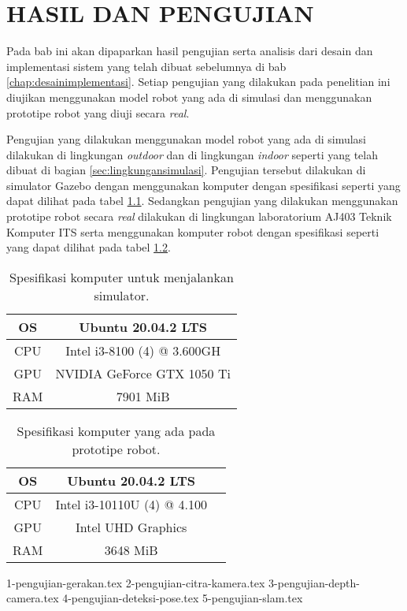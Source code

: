 \chapter{HASIL DAN PENGUJIAN}
\label{chap:hasilpengujian}

Pada bab ini akan dipaparkan hasil pengujian serta analisis dari desain dan implementasi sistem yang telah dibuat sebelumnya di bab \ref{chap:desainimplementasi}.
Setiap pengujian yang dilakukan pada penelitian ini diujikan menggunakan model robot yang ada di simulasi dan menggunakan prototipe robot yang diuji secara \emph{real}.

Pengujian yang dilakukan menggunakan model robot yang ada di simulasi dilakukan di lingkungan \emph{outdoor} dan di lingkungan \emph{indoor} seperti yang telah dibuat di bagian \ref{sec:lingkungansimulasi}.
Pengujian tersebut dilakukan di simulator Gazebo dengan menggunakan komputer dengan spesifikasi seperti yang dapat dilihat pada tabel \ref{tb:spesifikasikomputersimulator}.
Sedangkan pengujian yang dilakukan menggunakan prototipe robot secara \emph{real} dilakukan di lingkungan laboratorium AJ403 Teknik Komputer ITS serta menggunakan komputer robot dengan spesifikasi seperti yang dapat dilihat pada tabel \ref{tb:spesifikasikomputerrobot}.

\begin{longtable}{|c|c|}
  \caption{Spesifikasi komputer untuk menjalankan simulator.}
  \label{tb:spesifikasikomputersimulator}\\
  \hline
  OS  & Ubuntu 20.04.2 LTS \\
  \hline
  CPU & Intel i3-8100 (4) @ 3.600GH \\
  \hline
  GPU & NVIDIA GeForce GTX 1050 Ti \\
  \hline
  RAM & 7901 MiB \\
  \hline
\end{longtable}

\begin{longtable}{|c|c|c|}
  \caption{Spesifikasi komputer yang ada pada prototipe robot.}
  \label{tb:spesifikasikomputerrobot}\\
  \hline
  OS  & Ubuntu 20.04.2 LTS \\
  \hline
  CPU & Intel i3-10110U (4) @ 4.100 \\
  \hline
  GPU & Intel UHD Graphics \\
  \hline
  RAM & 3648 MiB \\
  \hline
\end{longtable}

{1-pengujian-gerakan.tex}
{2-pengujian-citra-kamera.tex}
{3-pengujian-depth-camera.tex}
{4-pengujian-deteksi-pose.tex}
{5-pengujian-slam.tex}

